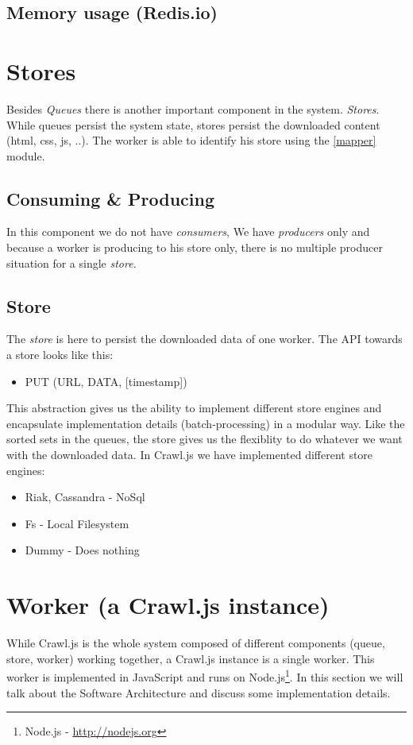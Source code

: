 \subsection{Memory usage (Redis.io)}

\section{Stores}
Besides \emph{Queues} there is another important component in the system. \emph{Stores}. While queues persist the system state, stores persist the downloaded content (html, css, js, ..). The worker is able to identify his store using the \ref{mapper} module.
\subsection{Consuming \& Producing}
In this component we do not have \emph{consumers}, We have \emph{producers} only and because a worker is producing to his store only, there is no multiple producer situation for a single \emph{store}.

\subsection{Store}
The \emph{store} is here to persist the downloaded data of one worker. The API towards a store looks like this:
\begin{itemize}
  \item PUT (URL, DATA, [timestamp])
\end{itemize}
This abstraction gives us the ability to implement different store engines and encapsulate implementation details (batch-processing) in a modular way. Like the sorted sets in the queues, the store gives us the flexiblity to do whatever we want with the downloaded data. In Crawl.js we have implemented different store engines:
\begin{itemize}
  \item Riak, Cassandra - NoSql
  \item Fs - Local Filesystem
  \item Dummy - Does nothing
\end{itemize}

\section{Worker (a Crawl.js instance)}
\label{worker}
While Crawl.js is the whole system composed of different components (queue, store, worker) working together, a Crawl.js instance is a single worker. This worker is implemented in JavaScript and runs on Node.js\footnote{Node.js - \url{http://nodejs.org}}.
In this section we will talk about the Software Architecture and discuss some implementation details.

